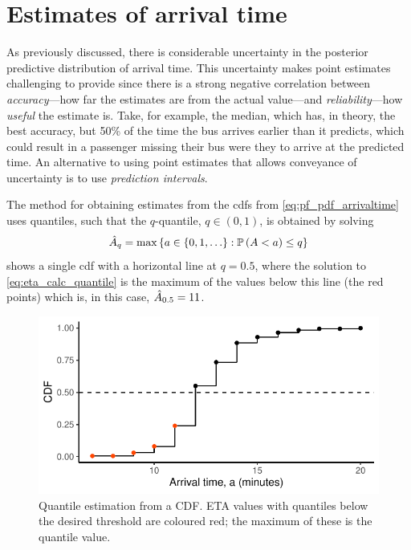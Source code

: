 \section{Estimates of arrival time}
\label{sec:eta_estimates}

As previously discussed, there is considerable uncertainty in the posterior predictive distribution of arrival time. This uncertainty makes point estimates challenging to provide since there is a strong negative correlation between \emph{accuracy}---how far the estimates are from the actual value---and \emph{reliability}---how \emph{useful} the estimate is. Take, for example, the median, which has, in theory, the best accuracy, but 50\% of the time the bus arrives earlier than it predicts, which could result in a passenger missing their bus were they to arrive at the predicted time. An alternative to using point estimates that allows conveyance of uncertainty is to use \emph{prediction intervals}.

The method for obtaining estimates from the \glspl{cdf} from \cref{eq:pf_pdf_arrivaltime} uses quantiles, such that the $q$-quantile, $q\in(0,1)$, is obtained by solving
\begin{equation}
\label{eq:eta_calc_quantile}
\hat{A}_q = \max\left\{a \in \{0, 1, \ldots\} : \mathbb{P}\left(A < a\right) \leq q\right\}
\end{equation}
 shows a single \gls{cdf} with a horizontal line at $q = 0.5$, where the solution to \cref{eq:eta_calc_quantile} is the maximum of the values below this line (the red points) which is, in this case, $\hat{A}_{0.5} = 11$.


\begin{knitrout}\small
{}\color{fgcolor}\begin{figure}

{\centering \includegraphics[width=.6\textwidth]{figure/eta_calc_quantile-1} 

}

\caption[Quantile estimation from a CDF]{Quantile estimation from a CDF. ETA values with quantiles below the desired threshold are coloured red; the maximum of these is the quantile value.}\label{fig:eta_calc_quantile}
\end{figure}


\end{knitrout}




